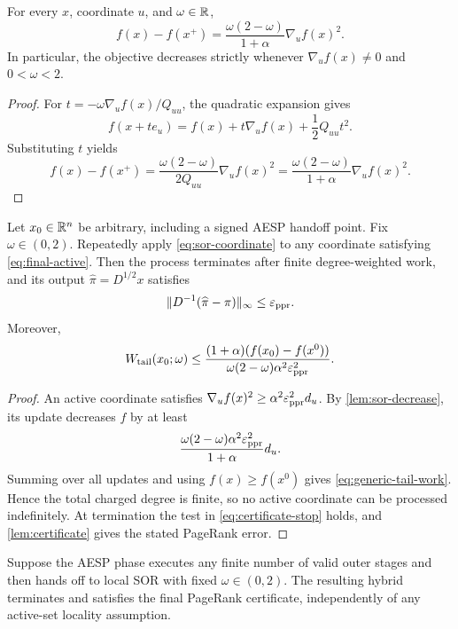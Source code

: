 \begin{lemma}
\label{lem:sor-decrease}
For every $x$, coordinate $u$, and $\omega\in\mathbb{R}$,
\begin{equation}
  f(x)-f(x^+)
  =\frac{\omega(2-\omega)}{1+\alpha}\nabla_u f(x)^2.
  \label{eq:sor-exact-decrease}
\end{equation}
In particular, the objective decreases strictly whenever
$\nabla_u f(x)\neq0$ and $0<\omega<2$.
\end{lemma}

\begin{proof}
For $t=-\omega\nabla_u f(x)/Q_{uu}$, the quadratic expansion gives
\[
  f(x+te_u)
  =f(x)+t\nabla_u f(x)+\frac12Q_{uu}t^2.
\]
Substituting $t$ yields
\[
  f(x)-f(x^+)
  =\frac{\omega(2-\omega)}{2Q_{uu}}\nabla_u f(x)^2
  =\frac{\omega(2-\omega)}{1+\alpha}\nabla_u f(x)^2.
\]
\end{proof}

\begin{theorem}
\label{thm:finite-tail}
Let $x_0\in\mathbb{R}^n$ be arbitrary, including a signed AESP handoff point.  Fix
$\omega\in(0,2)$.  Repeatedly apply \cref{eq:sor-coordinate} to any coordinate
satisfying \cref{eq:final-active}.  Then the process terminates after finite
degree-weighted work, and its output $\widehat\pi=D^{1/2}x$ satisfies
\[
  \lVert D^{-1}(\widehat\pi-\pi)\rVert_\infty\leq\varepsilon_{\mathrm{ppr}}.
\]
Moreover,
\begin{equation}
  W_{\rm tail}(x_0;\omega)
  \leq
  \frac{(1+\alpha)(f(x_0)-f(x^0))}
       {\omega(2-\omega)\alpha^2\varepsilon_{\mathrm{ppr}}^2}.
  \label{eq:generic-tail-work}
\end{equation}
\end{theorem}

\begin{proof}
An active coordinate satisfies
$\nabla_u f(x)^2\geq\alpha^2\varepsilon_{\mathrm{ppr}}^2d_u$.  By
\cref{lem:sor-decrease}, its update decreases $f$ by at least
\[
  \frac{\omega(2-\omega)\alpha^2\varepsilon_{\mathrm{ppr}}^2}{1+\alpha}d_u.
\]
Summing over all updates and using $f(x)\geq f(x^0)$ gives
\cref{eq:generic-tail-work}.  Hence the total charged degree is finite, so no
active coordinate can be processed indefinitely.  At termination the test in
\cref{eq:certificate-stop} holds, and \cref{lem:certificate} gives the stated
PageRank error.
\end{proof}

\begin{corollary}
\label{cor:hybrid-converges}
Suppose the AESP phase executes any finite number of valid outer stages and
then hands off to local SOR with fixed $\omega\in(0,2)$.  The resulting hybrid
terminates and satisfies the final PageRank certificate, independently of any
active-set locality assumption.
\end{corollary}

